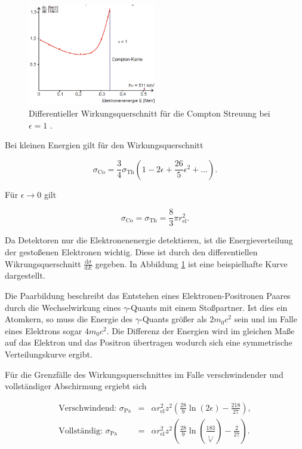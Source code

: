 \begin{figure}
	\centering
	\includegraphics[width = 0.5\textwidth]{pic/compton2.png}
	\caption{Differentieller Wirkungsquerschnitt für die Compton Streuung bei $\epsilon = 1$ \cite{anleitung}.}
	\label{compton2}
\end{figure}
Bei kleinen Energien gilt für den Wirkungsquerschnitt 

\begin{equation}
	\sigma_\text{Co} = \frac{3}{4} \sigma_\text{Th} \left(1 - 2\epsilon + \frac{26}{5} \epsilon^2 + ...\right) .
\end{equation}

Für $\epsilon \rightarrow 0$ gilt

\begin{equation}
	\sigma_\text{Co} = \sigma_\text{Th} = \frac{8}{3} \pi r_\text{el}^2 . 
\end{equation}

Da Detektoren nur die Elektronenenergie detektieren, ist die Energieverteilung der gestoßenen Elektronen wichtig.
Diese ist durch den differentiellen Wikrungsquerschnitt $\frac{\text{d}\sigma}{\text{d}E}$ gegeben.
In Abbildung \ref{compton2} ist eine beispielhafte Kurve dargestellt.\\
\FloatBarrier

Die Paarbildung beschreibt das Entstehen eines Elektronen-Positronen Paares durch die Wechselwirkung eines $\gamma$-Quants mit einem Stoßpartner.
Ist dies ein Atomkern, so muss die Energie des $\gamma$-Quants größer als $2 m_\text{0} c^2$ sein und im Falle eines Elektrons sogar $4 m_\text{0} c^2$.
Die Differenz der Energien wird im gleichen Maße auf das Elektron und das Positron übertragen wodurch sich eine symmetrische Verteilungskurve ergibt.

Für die Grenzfälle des Wirkungsquerschnittes im Falle verschwindender und vollständiger Abschirmung ergiebt sich

\begin{eqnarray}
	\text{Verschwindend: } \sigma_\text{Pa} &=& \alpha r_\text{el}^2 z^2 \left(\frac{28}{9} \ln(2\epsilon) - \frac{218}{27}\right) ,\\
	\text{Vollständig: } \sigma_\text{Pa} &=& \alpha r_\text{el}^2 z^2 \left(\frac{28}{9} \ln(\frac{183}{\sqrt[3]{}}) - \frac{2}{27}\right) .
\end{eqnarray}

